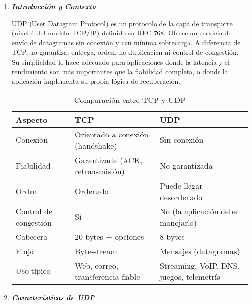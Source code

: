 \documentclass[12pt]{amsart}
\begin{document}
	\begin{enumerate}
		
		\thispagestyle{empty}
		
		\item \textbf{\textit{Introducción y Contexto}}
		
		\medskip
		UDP (User Datagram Protocol) es un protocolo de la capa de transporte (nivel 4 del modelo TCP/IP) definido en RFC 768. Ofrece un servicio de envío de datagramas sin conexión y con mínima sobrecarga. A diferencia de TCP, no garantiza: entrega, orden, no duplicación ni control de congestión. Su simplicidad lo hace adecuado para aplicaciones donde la latencia y el rendimiento son más importantes que la fiabilidad completa, o donde la aplicación implementa su propia lógica de recuperación.

		\medskip		
		
		\begin{table}[ht]
		\centering
		\begin{tabular}{|l|l|l|}
		\hline
		\textbf{Aspecto} & \textbf{TCP} & \textbf{UDP} \\ 
		\hline
		Conexión & Orientado a conexión (handshake) & Sin conexión \\ 
		\hline
		Fiabilidad & Garantizada (ACK, retransmisión) & No garantizada \\ 
		\hline
		Orden & Ordenado & Puede llegar desordenado \\ 
		\hline
		Control de congestión & Sí & No (la aplicación debe manejarlo) \\ 
		\hline
		Cabecera & 20 bytes + opciones & 8 bytes \\ 
		\hline
		Flujo & Byte-stream & Mensajes (datagramas) \\ 
		\hline
		Uso típico & Web, correo, transferencia fiable & Streaming, VoIP, DNS, juegos, telemetría \\ 
		\hline
		\end{tabular}
		\medskip
		\caption{Comparación entre TCP y UDP}
		\label{tab:tcp_udp_comparison}
		\end{table}
		
		\bigskip\bigskip

		\item \textbf{\textit{Características de UDP}}
		\medskip

		\begin{itemize}


\end{itemize}
\end{enumerate}
\end{document}
